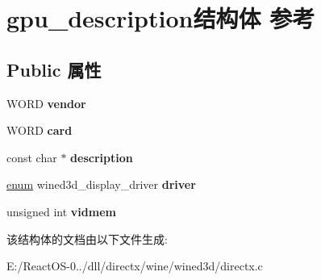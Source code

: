 \hypertarget{structgpu__description}{}\section{gpu\+\_\+description结构体 参考}
\label{structgpu__description}
\subsection*{Public 属性}
\begin{DoxyCompactItemize}
\item 
\mbox{\label{structgpu__description_a122cf5daff1be3c7350efd8e5668cbd2}} 
W\+O\+RD {\bfseries vendor}
\item 
\mbox{\label{structgpu__description_a53ac5196cda9186555571ba19be10913}} 
W\+O\+RD {\bfseries card}
\item 
\mbox{\label{structgpu__description_a18238dc13f80f9c01208b559a30f19ea}} 
const char $\ast$ {\bfseries description}
\item 
\mbox{\label{structgpu__description_a13ba25e16f7963b0d5257eba6c641279}} 
\hyperlink{interfaceenum}{enum} wined3d\+\_\+display\+\_\+driver {\bfseries driver}
\item 
\mbox{\label{structgpu__description_af1641c322fbf41ce351d5621c599a3cb}} 
unsigned int {\bfseries vidmem}
\end{DoxyCompactItemize}


该结构体的文档由以下文件生成\+:\begin{DoxyCompactItemize}
\item 
E\+:/\+React\+O\+S-\/0../dll/directx/wine/wined3d/directx.\+c\end{DoxyCompactItemize}

